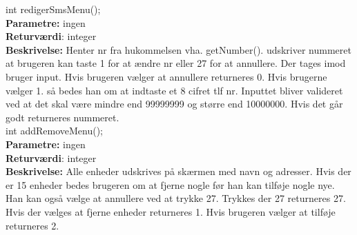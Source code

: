 \newpage
int redigerSmsMenu(); \\
\textbf{Parametre:} ingen \\
\textbf{Returværdi}: integer \\
\textbf{Beskrivelse:} Henter nr fra hukommelsen vha. getNumber(). udskriver nummeret at brugeren kan taste 1 for at ændre nr eller 27 for at annullere. Der tages imod bruger input. Hvis brugeren vælger at annullere returneres 0. Hvis brugerne vælger 1. så bedes han om at indtaste et 8 cifret tlf nr. Inputtet bliver valideret ved at det skal være mindre end 99999999 og større end 10000000. Hvis det går godt returneres nummeret. \\

int addRemoveMenu(); \\
\textbf{Parametre:} ingen \\
\textbf{Returværdi}: integer \\
\textbf{Beskrivelse:} Alle enheder udskrives på skærmen med navn og adresser. Hvis der er 15 enheder bedes brugeren om at fjerne nogle før han kan tilføje nogle nye. Han kan også vælge at annullere ved at trykke 27. Trykkes der 27 returneres 27. Hvis der vælges at fjerne enheder returneres 1. Hvis brugeren vælger at tilføje returneres 2. \\




